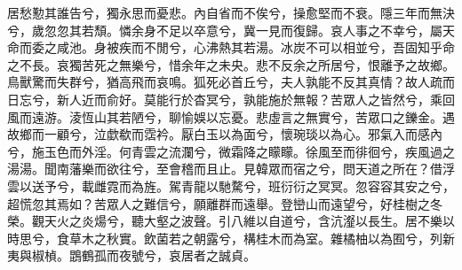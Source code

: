 
\begin{pinyinscope}
居愁懃其誰告兮，獨永思而憂悲。內自省而不俟兮，操愈堅而不衰。隱三年而無決兮，歲忽忽其若頹。憐余身不足以卒意兮，冀一見而復歸。哀人事之不幸兮，屬天命而委之咸池。身被疾而不閒兮，心沸熱其若湯。冰炭不可以相並兮，吾固知乎命之不長。哀獨苦死之無樂兮，惜余年之未央。悲不反余之所居兮，恨離予之故鄉。鳥獸驚而失群兮，猶高飛而哀鳴。狐死必首丘兮，夫人孰能不反其真情？故人疏而日忘兮，新人近而俞好。莫能行於杳冥兮，孰能施於無報？苦眾人之皆然兮，乘回風而遠游。淩恆山其若陋兮，聊愉娛以忘憂。悲虛言之無實兮，苦眾口之鑠金。遇故鄉而一顧兮，泣歔欷而霑衿。厭白玉以為面兮，懷琬琰以為心。邪氣入而感內兮，施玉色而外淫。何青雲之流瀾兮，微霜降之矇矇。徐風至而徘徊兮，疾風過之湯湯。聞南藩樂而欲往兮，至會稽而且止。見韓眾而宿之兮，問天道之所在？借浮雲以送予兮，載雌霓而為旌。駕青龍以馳騖兮，班衍衍之冥冥。忽容容其安之兮，超慌忽其焉如？苦眾人之難信兮，願離群而遠舉。登巒山而遠望兮，好桂樹之冬榮。觀天火之炎煬兮，聽大壑之波聲。引八維以自道兮，含沆瀣以長生。居不樂以時思兮，食草木之秋實。飲菌若之朝露兮，構桂木而為室。雜橘柚以為囿兮，列新夷與椒楨。鵾鶴孤而夜號兮，哀居者之誠貞。


\end{pinyinscope}